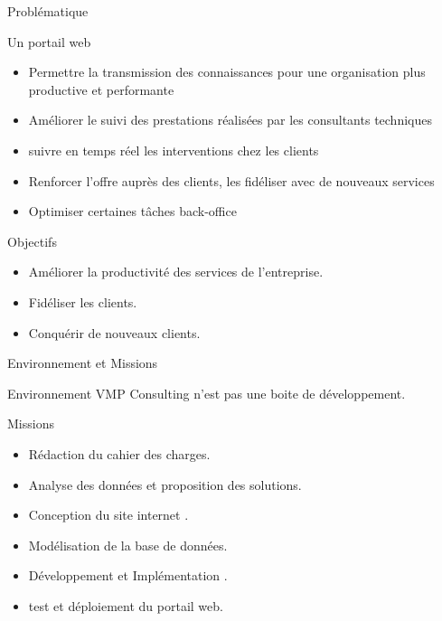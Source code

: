 \documentclass[french]{beamer}
\begin{document}
\begin{frame}{Problématique}
    \begin{alertblock}{Un portail web}
    \begin{itemize}

 \item   Permettre la transmission des connaissances pour une organisation plus productive et performante
 \item     Améliorer le suivi des prestations réalisées par les consultants techniques 
 \item suivre en temps réel les interventions chez les clients
 
 \item   Renforcer  l'offre auprès des clients, les fidéliser avec de nouveaux services
 \item   Optimiser certaines tâches back-office 
\end{itemize}
   
	\end{alertblock} 
	\pause
	 \begin{alertblock}{Objectifs}
    \begin{itemize}

\item Améliorer la productivité des services de l'entreprise.
\item Fidéliser les clients.

\item Conquérir de nouveaux clients.
\end{itemize}
   
	\end{alertblock}   	
	
\end{frame}


\begin{frame}{Environnement et Missions}
	\begin{block}{Environnement}
	VMP Consulting n'est pas une boite de développement.
	\end{block}
	\pause
	\begin{block}{Missions}
        	
	\begin{itemize}
\item Rédaction  du cahier des charges.
\item Analyse des données et proposition des solutions.
\item Conception  du site internet .  
\item Modélisation de la base de données.
\item Développement et Implémentation .
\item test et déploiement du portail web.
\end{itemize}
	
	\end{block}
	
	
\end{frame}
\end{document}
